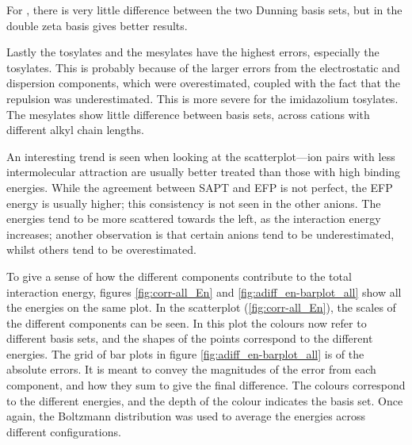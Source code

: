 For , there is very little difference between the two Dunning basis sets, but in  the double zeta basis gives better results. 


Lastly the tosylates and the mesylates have the highest errors, especially the tosylates. 
This is probably because of the larger errors from the electrostatic and dispersion components, which were overestimated, coupled with the fact that the repulsion was underestimated. 
This is more severe for the imidazolium tosylates.
The mesylates show little difference between basis sets, across cations with different alkyl chain lengths.


An interesting trend is seen when looking at the scatterplot---ion pairs with less intermolecular attraction are usually better treated than those with high binding energies.
While the agreement between SAPT and EFP is not perfect, the EFP energy is usually higher; this consistency is not seen in the other anions.
The energies tend to be more scattered towards the left, as the interaction energy increases; another observation is that certain anions tend to be underestimated, whilst others tend to be overestimated.


To give a sense of how the different components contribute to the total interaction energy, figures 
\ref{fig:corr-all_En} and
\ref{fig:adiff_en-barplot_all}
show all the energies on the same plot.
In the scatterplot (\ref{fig:corr-all_En}), the scales of the different components can be seen.
In this plot the colours now refer to different basis sets, and the shapes of the points correspond to the different energies.
The grid of bar plots in figure \ref{fig:adiff_en-barplot_all} is of the absolute errors.
It is meant to convey the magnitudes of the error from each component, and how they sum to give the final difference.
The colours correspond to the different energies, and the depth of the colour indicates the basis set.
Once again, the Boltzmann distribution was used to average the energies across different configurations.


